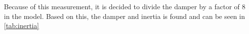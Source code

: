 Because of this measurement, it is decided to divide the damper by a factor of 8 in the model. Based on this, the damper and inertia is found and can be seen in \autoref{tab:inertia}

\begin{table}[H]
\centering
{}
\caption{The friction coefficient B, and Inertia J, to be used in model.}
\label{tab:inertia}
\end{table}


%
%
%
%
